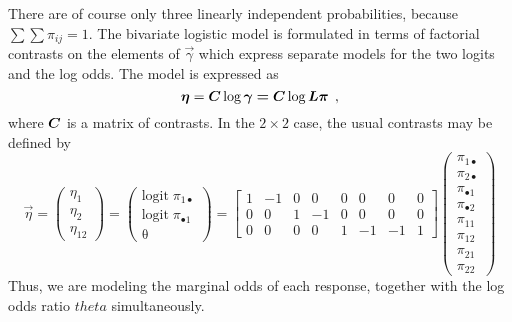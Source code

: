 There are of course only three linearly independent probabilities, because $%
\sum \sum \pi _{ij}=1$. The bivariate logistic model is formulated in terms
of factorial contrasts on the elements of $\vec{\gamma }$ which express
separate models for the two logits and the log odds. The model is expressed
as
\begin{equation*}%
 \vec{\eta }=\mat{C}\log \vec{\gamma =\mat{C}}\log \mat{L \pi}
 \comma
\end{equation*}
where $\bm{C}$ is a matrix of contrasts. In the $2\times 2$ case, the
usual contrasts may be defined by
\begin{equation}\label{eq:eta2}
\vec{\eta }=\left(
\begin{array}{c}
\eta _1 \\
\eta _2 \\
\eta _{12}
\end{array}
\right) =\left(
\begin{array}{c}
\mathrm{logit}\;\pi _{1\bullet } \\
\mathrm{logit}\;\pi _{\bullet 1} \\
\mathrm{\theta}
\end{array}
\right) =\left[
\begin{array}{rrrrrrrr}
1 & -1 & 0 & 0 & 0 & 0 & 0 & 0 \\
0 &  0 & 1 & -1 & 0 & 0 & 0 & 0 \\
0 &  0 & 0 & 0 & 1 & -1 & -1 & 1
\end{array}
\right] \left(
\begin{array}{c}
\pi _{1\bullet } \\
\pi _{2\bullet } \\
\pi _{\bullet 1} \\
\pi _{\bullet 2} \\
\pi _{11} \\
\pi _{12} \\
\pi _{21} \\
\pi _{22}
\end{array}
\right)
\end{equation}
Thus, we are modeling the marginal odds of each response, together
with the log odds ratio $theta$ simultaneously.

